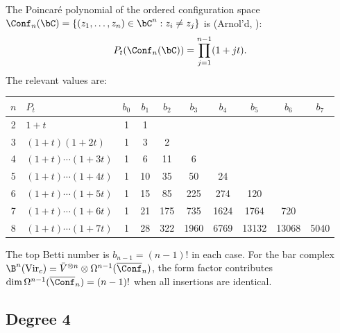 \begin{computation}
\label{comp:poincare-config}
The Poincar\'{e} polynomial of the ordered configuration space
$\Conf_n(\bC) = \{(z_1, \ldots, z_n) \in \bC^n : z_i \neq z_j\}$
is (Arnol'd, \cite{Arnold69}):
\begin{equation}\label{eq:poincare-config}
P_t(\Conf_n(\bC)) = \prod_{j=1}^{n-1}(1 + jt).
\end{equation}
The relevant values are:
\begin{center}
\renewcommand{\arraystretch}{1.15}
{\small
\begin{tabular}{c|l|cccccccc}
$n$ & $P_t$ & $b_0$ & $b_1$ & $b_2$ & $b_3$ & $b_4$ & $b_5$ & $b_6$ & $b_7$ \\
\hline
2 & $1 + t$ & 1 & 1 \\
3 & $(1+t)(1+2t)$ & 1 & 3 & 2 \\
4 & $(1+t)\cdots(1+3t)$ & 1 & 6 & 11 & 6 \\
5 & $(1+t)\cdots(1+4t)$ & 1 & 10 & 35 & 50 & 24 \\
6 & $(1+t)\cdots(1+5t)$ & 1 & 15 & 85 & 225 & 274 & 120 \\
7 & $(1+t)\cdots(1+6t)$ & 1 & 21 & 175 & 735 & 1624 & 1764 & 720 \\
8 & $(1+t)\cdots(1+7t)$ & 1 & 28 & 322 & 1960 & 6769 & 13132 & 13068 & 5040
\end{tabular}
}
\end{center}
The top Betti number is $b_{n-1} = (n-1)!$ in each case.
For the bar complex $\B^n(\mathrm{Vir}_c) = \bar{V}^{\otimes n}
\otimes \Omega^{n-1}(\overline{\Conf}_n)$, the form factor
contributes $\dim \Omega^{n-1}(\overline{\Conf}_n) = (n-1)!$
when all insertions are identical.
\end{computation}

\subsection{Degree 4}

